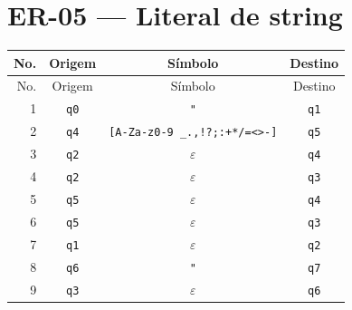 \documentclass[12pt,a4paper,oneside]{report}
\begin{document}
\section{ER-05 --- Literal de string}
\small
\begin{longtable}{|r|c|c|c|}
\toprule
No. & Origem & Símbolo & Destino \\
\midrule
\endfirsthead
\toprule
No. & Origem & Símbolo & Destino \\
\midrule
\endhead
1 & \texttt{q0} & \texttt{"} & \texttt{q1} \\
2 & \texttt{q4} & \texttt{[A-Za-z0-9 \_.,!?;:+*/=<>-]} & \texttt{q5} \\
3 & \texttt{q2} & $\varepsilon$ & \texttt{q4} \\
4 & \texttt{q2} & $\varepsilon$ & \texttt{q3} \\
5 & \texttt{q5} & $\varepsilon$ & \texttt{q4} \\
6 & \texttt{q5} & $\varepsilon$ & \texttt{q3} \\
7 & \texttt{q1} & $\varepsilon$ & \texttt{q2} \\
8 & \texttt{q6} & \texttt{"} & \texttt{q7} \\
9 & \texttt{q3} & $\varepsilon$ & \texttt{q6} \\
\bottomrule
\end{longtable}
\end{document}
